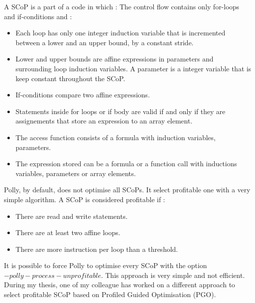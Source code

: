 \begin{definition}{}
A SCoP is a part of a code in which :
The control flow contains only for-loops and if-conditions and :
\begin{itemize}
\item Each loop has only one integer induction variable that is incremented between a lower and an upper bound, by a constant stride.
\item Lower and upper bounds are affine expressions in parameters and surrounding loop induction variables. A parameter is a integer variable that is keep constant throughout the SCoP.
\item If-conditions compare two affine expressions.
\item Statements inside for loops or if body are valid if and only if they are assignements that store an expression to an array element.
\item The access function consists of a formula with induction variables, parameters.
\item The expression stored can be a formula or a function call with inductions variables, parameters or array elements.
\end{itemize}\end{definition}

Polly, by default, does not optimise all SCoPs. It select profitable one with a very simple algorithm. A SCoP is considered profitable if :
\begin{itemize}
\item There are read and write statements.
\item There are at least two affine loops. 
\item There are more instruction per loop than a threshold.
\end{itemize}

It is possible to force Polly to optimise every SCoP with the option $-polly-process-unprofitable$. This approach is very simple and not efficient. During my thesis, one of my colleague has worked on a different approach to select profitable SCoP based on Profiled Guided Optimisation (PGO)\cite{PGO}.

